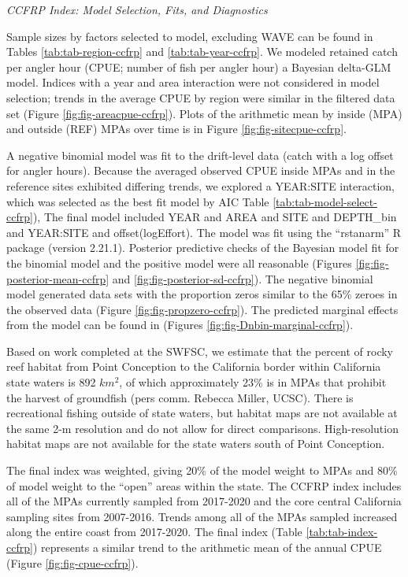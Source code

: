 \documentclass[
]{article}
\begin{document}
\emph{CCFRP Index: Model Selection, Fits, and Diagnostics}

Sample sizes by factors selected to model, excluding WAVE can be found in Tables
\ref{tab:tab-region-ccfrp} and \ref{tab:tab-year-ccfrp}.
We modeled retained catch per angler hour (CPUE; number of fish per angler hour)
a Bayesian delta-GLM model. Indices with a year and area interaction were not
considered in model selection; trends in the average CPUE by region were similar
in the filtered data set (Figure \ref{fig:fig-areacpue-ccfrp}). Plots of the arithmetic
mean by inside (MPA) and outside (REF) MPAs over time is in Figure \ref{fig:fig-sitecpue-ccfrp}.

A negative binomial model was fit to the drift-level data (catch with a log offset for angler
hours). Because the averaged observed CPUE inside MPAs and in the reference sites exhibited
differing trends, we explored a YEAR:SITE interaction, which was selected as the best
fit model by AIC Table \ref{tab:tab-model-select-ccfrp}), The final model included
YEAR and AREA and SITE and DEPTH\_bin and YEAR:SITE and offset(logEffort).
The model was fit using the ``rstanarm'' R package (version 2.21.1). Posterior predictive
checks of the Bayesian model fit for the binomial model and the positive model
were all reasonable (Figures \ref{fig:fig-posterior-mean-ccfrp} and
\ref{fig:fig-posterior-sd-ccfrp}). The negative binomial model generated data sets with the
proportion zeros similar to the 65\% zeroes in the observed data
(Figure \ref{fig:fig-propzero-ccfrp}). The predicted marginal effects from the model can be found in (Figures \ref{fig:fig-Dnbin-marginal-ccfrp}).

Based on work completed at the SWFSC, we estimate that the percent of rocky reef habitat from Point Conception to the California border within California state waters is 892 \(km^2\), of which approximately 23\% is in MPAs that prohibit the harvest of groundfish (pers comm. Rebecca Miller, UCSC). There is recreational fishing outside of state waters, but habitat maps are not available at the same 2-m resolution and do not allow for direct comparisons. High-resolution habitat maps are not available for the state waters south of Point Conception.

The final index was weighted, giving 20\% of the model weight to MPAs and 80\% of model
weight to the ``open'' areas within the state. The CCFRP index includes all of the
MPAs currently sampled from 2017-2020 and the core central California sampling sites
from 2007-2016. Trends among all of the MPAs sampled increased along the entire coast
from 2017-2020. The final index (Table \ref{tab:tab-index-ccfrp})
represents a similar trend to the arithmetic mean of the annual CPUE (Figure \ref{fig:fig-cpue-ccfrp}).
\end{document}

